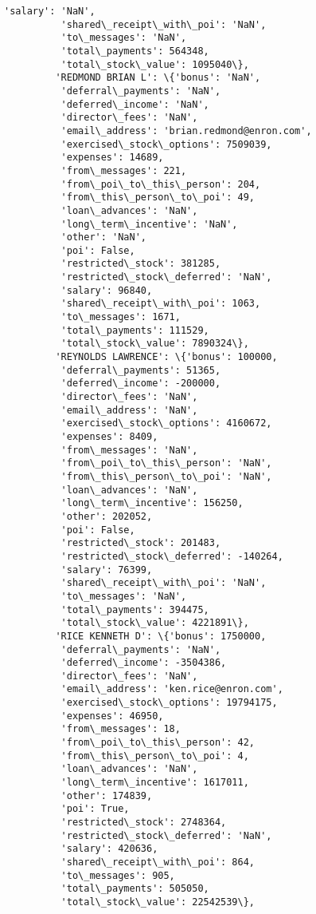 \documentclass[11pt]{article}
\begin{document}
\begin{Verbatim}[commandchars=\\\{\}]
          'salary': 'NaN',
          'shared\_receipt\_with\_poi': 'NaN',
          'to\_messages': 'NaN',
          'total\_payments': 564348,
          'total\_stock\_value': 1095040\},
         'REDMOND BRIAN L': \{'bonus': 'NaN',
          'deferral\_payments': 'NaN',
          'deferred\_income': 'NaN',
          'director\_fees': 'NaN',
          'email\_address': 'brian.redmond@enron.com',
          'exercised\_stock\_options': 7509039,
          'expenses': 14689,
          'from\_messages': 221,
          'from\_poi\_to\_this\_person': 204,
          'from\_this\_person\_to\_poi': 49,
          'loan\_advances': 'NaN',
          'long\_term\_incentive': 'NaN',
          'other': 'NaN',
          'poi': False,
          'restricted\_stock': 381285,
          'restricted\_stock\_deferred': 'NaN',
          'salary': 96840,
          'shared\_receipt\_with\_poi': 1063,
          'to\_messages': 1671,
          'total\_payments': 111529,
          'total\_stock\_value': 7890324\},
         'REYNOLDS LAWRENCE': \{'bonus': 100000,
          'deferral\_payments': 51365,
          'deferred\_income': -200000,
          'director\_fees': 'NaN',
          'email\_address': 'NaN',
          'exercised\_stock\_options': 4160672,
          'expenses': 8409,
          'from\_messages': 'NaN',
          'from\_poi\_to\_this\_person': 'NaN',
          'from\_this\_person\_to\_poi': 'NaN',
          'loan\_advances': 'NaN',
          'long\_term\_incentive': 156250,
          'other': 202052,
          'poi': False,
          'restricted\_stock': 201483,
          'restricted\_stock\_deferred': -140264,
          'salary': 76399,
          'shared\_receipt\_with\_poi': 'NaN',
          'to\_messages': 'NaN',
          'total\_payments': 394475,
          'total\_stock\_value': 4221891\},
         'RICE KENNETH D': \{'bonus': 1750000,
          'deferral\_payments': 'NaN',
          'deferred\_income': -3504386,
          'director\_fees': 'NaN',
          'email\_address': 'ken.rice@enron.com',
          'exercised\_stock\_options': 19794175,
          'expenses': 46950,
          'from\_messages': 18,
          'from\_poi\_to\_this\_person': 42,
          'from\_this\_person\_to\_poi': 4,
          'loan\_advances': 'NaN',
          'long\_term\_incentive': 1617011,
          'other': 174839,
          'poi': True,
          'restricted\_stock': 2748364,
          'restricted\_stock\_deferred': 'NaN',
          'salary': 420636,
          'shared\_receipt\_with\_poi': 864,
          'to\_messages': 905,
          'total\_payments': 505050,
          'total\_stock\_value': 22542539\},

\end{Verbatim}
\end{document}
